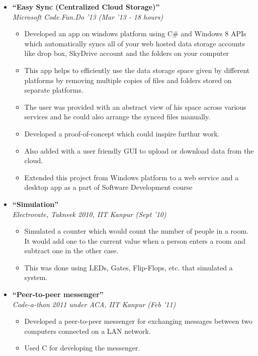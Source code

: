 \documentclass[margin,line]{resume}
\begin{document}
\begin{resume}
\begin{itemize}
  \item \large{\textbf{\textsf{``Easy Sync (Centralized Cloud Storage)''}}}
    \\ \small{\textit{Microsoft Code.Fun.Do '13 (Mar '13 - 18 hours)}}
    \normalsize
    \begin{itemize}
    \item Developed an app on windows platform using C\# and Windows 8 APIs which automatically syncs all of your web hosted data storage accounts like drop box, SkyDrive account and the folders on your computer 
    \item This app helps to efficiently use the data storage space given by different platforms by removing multiple copies of files and folders stored on separate platforms.
    \item The user was provided with an abstract view of his space across various services and he could also arrange the synced files manually.
    \item Developed a proof-of-concept which could inspire furthur work.
    \item Also added with a user friendly GUI to upload or download data from the cloud.
    \item Extended this project from Windows platform to a web service and a desktop app as a part of Software Development course
    \end{itemize}

  \item \large{\textbf{\textsf{``Simulation''}}}
    \\ \small{\textit{Electrovate, Takneek 2010, IIT Kanpur (Sept '10)}}
    \normalsize
    \begin{itemize}
    \item Simulated a counter which would count the number of people in a room. It would add one to the current value when a person enters a room and subtract one in the other case.
    \item This was done using LEDs, Gates, Flip-Flops, etc. that simulated a system.
    \end{itemize}

  \item \large{\textbf{\textsf{``Peer-to-peer messenger''}}}
    \\ \small{\textit{Code-a-thon 2011 under ACA, IIT Kanpur (Feb '11)}}
    \normalsize
    \begin{itemize}
    \item Developed a peer-to-peer messenger for exchanging messages between two computers connected on a LAN network.
    \item Used C for developing the messenger.
    \end{itemize}


\end{itemize}
\end{resume}
\end{document}
